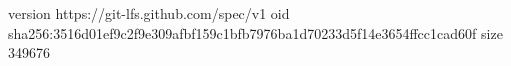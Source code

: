 version https://git-lfs.github.com/spec/v1
oid sha256:3516d01ef9c2f9e309afbf159c1bfb7976ba1d70233d5f14e3654ffcc1cad60f
size 349676

